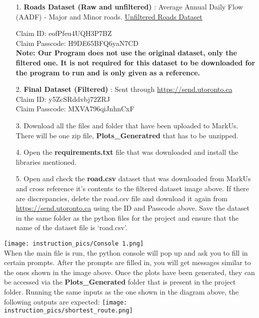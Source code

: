 \documentclass[fontsize=11pt]{IEEEtran}
\begin{document}
\begin{enumerate}
    \item [1.] \textbf{Roads Dataset (Raw and unfiltered)} : Average Annual Daily Flow (AADF) - Major and Minor roads. \cite{8} \href{https://data.gov.uk/dataset/208c0e7b-353f-4e2d-8b7a-1a7118467acc/gb-road-traffic-counts}{Unfiltered Roads Dataset}

        Claim ID: eofPfeu4UQH3P7BZ\\
        Claim Passcode: H9DE65BFQ6yaN7CD\\

    \textbf{Note: Our Program does not use the original dataset, only the filtered one. It is not required for this dataset to be downloaded for the program to run and is only given as a reference.}
    \\
    \item [2.] \textbf{Final Dataset (Filtered)} : Sent through \href{https://send.utoronto.ca}{https://send.utoronto.ca}\\
        Claim ID: y5ZcSRddvbj72ZRJ\\
        Claim Passcode: MXVA796qiJnhnCxF
    \\
    \item [3.] Download all the files and folder that have been uploaded to MarkUs. There will be one zip file, \textbf{Plots\_Generatred} that has to be unzipped.
    \\
    \item [4.] Open the \textbf{requirements.txt} file that was downloaded and install the libraries mentioned.
    \\
    \item [5.] Open and check the \textbf{road.csv} dataset that was downloaded from MarkUs and cross reference it's contents to the filtered dataset image above. If there are discrepancies, delete the road.csv file and download it again from \href{https://send.utoronto.ca}{https://send.utoronto.ca} using the ID and Passcode above. Save the dataset in the same folder as the python files for the project and ensure that the name of the dataset file is ‘road.csv'.
    \\
\end{enumerate}

\texttt{[image: instruction\_pics/Console 1.png]}
\\

When the main file is run, the python console will pop up and ask you to fill in certain prompts. After the prompts are filled in, you will get messages similar to the ones shown in the image above. Once the plots have been generated, they can be accessed via the \textbf{Plots\_Generated} folder that is present in the project folder. Running the same inputs as the one shown in the diagram above, the following outputs are expected:
\newpage
\texttt{[image: instruction\_pics/shortest\_route.png]}
\\
\end{document}
